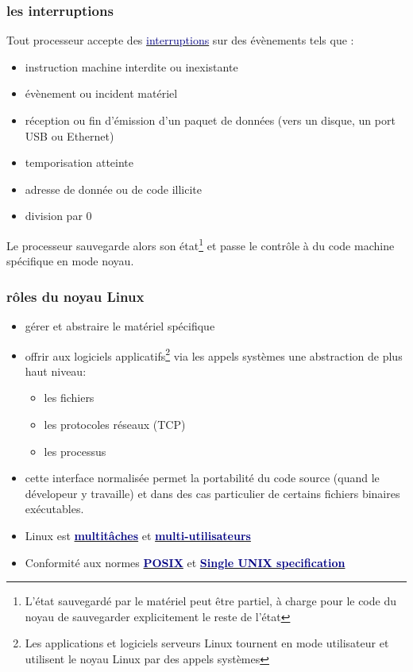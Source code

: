 \documentclass[lualatex,11pt,a4paper,svgnames,french]{beamer}
\begin{document}
\begin{frame}\frametitle{les interruptions}

  Tout processeur accepte des  \href{https://fr.wikipedia.org/wiki/Interruption_(informatique)}{\textcolor{Navy}{interruptions}} sur des évènements tels que :

  \begin{relsize}{-0.5}
  \begin{itemize}
  \item instruction machine interdite ou inexistante
  \item évènement ou incident matériel 
  \item réception ou fin d'émission d'un paquet de données (vers un
    disque, un port USB ou Ethernet)
  \item temporisation atteinte
  \item adresse de donnée ou de code illicite
  \item division par 0
  \end{itemize}
  \end{relsize}
  
  Le processeur sauvegarde alors son état\footnote{L'état sauvegardé par le
  matériel peut être partiel, à charge pour le code du noyau de
  sauvegarder explicitement le reste de l'état} et passe le contrôle à
  du code machine spécifique en mode noyau.
\end{frame}

\begin{frame}\frametitle{rôles du noyau Linux}

  \begin{itemize}
  \item gérer et abstraire le matériel spécifique
  \item offrir aux logiciels applicatifs\footnote{Les applications et
  logiciels serveurs Linux tournent en mode utilisateur et utilisent
  le noyau Linux par des appels systèmes} via les appels systèmes une
    abstraction de plus haut niveau:
    \begin{itemize}
    \item les fichiers
    \item les protocoles réseaux (TCP)
    \item les processus
    \end{itemize}
    \item cette interface normalisée permet la portabilité du code
      source (quand le dévelopeur y travaille) et dans des cas
      particulier de certains fichiers binaires exécutables.
    \item Linux est
      \href{https://fr.wikipedia.org/wiki/Multitâche}{\textbf{\textcolor{Navy}{multitâches}}}
      et \href{https://fr.wikipedia.org/wiki/Multi-utilisateur}{\textbf{\textcolor{Navy}{multi-utilisateurs}}}
      \item Conformité aux normes \href{https://fr.wikipedia.org/wiki/POSIX}{\textbf{\textcolor{Navy}{POSIX}}}  et \href{https://fr.wikipedia.org/wiki/Single_UNIX_Specification}{\textbf{\textcolor{Navy}{Single UNIX specification}}}
  \end{itemize}
\end{frame}
\end{document}
